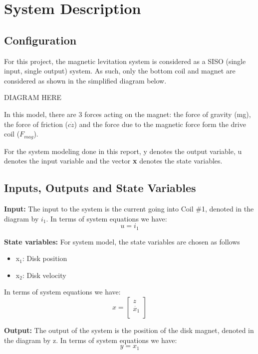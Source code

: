\chapter{System Description} 


\section{Configuration}
%	

For this project, the magnetic levitation system is considered as a SISO (single input, single output) system.  As such, only the bottom coil and magnet are considered as shown in the simplified diagram below.

DIAGRAM HERE

In this model, there are 3 forces acting on the magnet: the force of gravity (mg), the force of friction ($c\dot{z}$) and the force due to the magnetic force form the drive coil ($F_{mag}$).

For the system modeling done in this report, y denotes the output variable, u denotes the input variable and the vector \textbf{x} denotes the state variables.

\section{Inputs, Outputs and State Variables}

\textbf{Input:} The input to the system is the current going into Coil \#1, denoted in the diagram by $i_{1}$.
In terms of system equations we have:
\begin{equation}
u = i_{1}
\end{equation}

\textbf{State variables:} For system model, the state variables are chosen as follows
\begin{itemize}
\item x$_1$:  Disk position
\item x$_2$:  Disk velocity
\end{itemize}
In terms of system equations we have:
\begin{equation}
x = 
\left[
\begin{array}{c}
z\\
\dot{x_{1}}\\
\end{array}
\right]
\end{equation}

\textbf{Output:} The output of the system is the position of the disk magnet, denoted in the diagram by z.
In terms of system equations we have:
\begin{equation}
y = x_{1}
\end{equation}